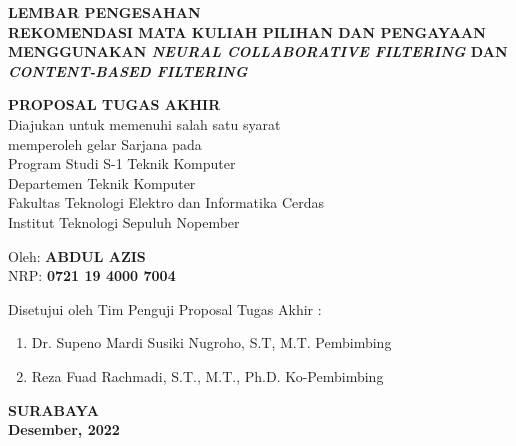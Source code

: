 {
\begin{center}
    \uppercase{\textbf{\large Lembar Pengesahan}} \\

    \vspace*{10mm}
    \uppercase{\textbf{Rekomendasi mata kuliah pilihan dan pengayaan menggunakan \emph{Neural Collaborative Filtering} dan \emph{Content-Based Filtering}}}
    \vspace*{10mm}

    {
        \uppercase{\textbf{Proposal Tugas Akhir}} \\
        Diajukan untuk memenuhi salah satu syarat          \\
        memperoleh gelar Sarjana pada                      \\
        Program Studi S-1 Teknik Komputer                  \\
        Departemen Teknik Komputer                         \\
        Fakultas Teknologi Elektro dan Informatika Cerdas  \\
        Institut Teknologi Sepuluh Nopember                \\
    }

    \vspace*{1.5cm}
    Oleh: \textbf{\uppercase{Abdul Azis}}                          \\
    NRP: \textbf{0721 19 4000 7004}                    \\
    \vspace*{1.5cm}

    Disetujui oleh Tim Penguji Proposal Tugas Akhir :  \\
    \vspace*{5mm}

    \begin{enumerate}
        \setlength\itemsep{1.5em}
        \item Dr. Supeno Mardi Susiki Nugroho, S.T, M.T. \hfill Pembimbing
        \item Reza Fuad Rachmadi, S.T., M.T., Ph.D. \hfill Ko-Pembimbing
    \end{enumerate}

    \vfill
    \uppercase{\textbf{surabaya}}                      \\
    \textbf{Desember, 2022}                              \\
\end{center}
}
